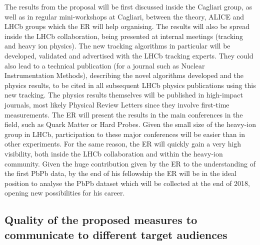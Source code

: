 \documentclass[a4paper,11pt]{article}
\newcommand{\ER}{ER\xspace}
\begin{document}
The results from the proposal will be first discussed inside the
Cagliari group, as well as in regular mini-workshops at Cagliari, 
between the theory, ALICE and LHCb groups which the \ER will
help organising. The results will also be
spread inside the LHCb collaboration, being presented at internal
meetings (tracking and heavy ion physics). The new tracking algorithms
in particular will be developed, validated and advertised with the
LHCb tracking experts. They could also lead to a technical publication
(for a journal such as Nuclear Instrumentation Methods), describing
the novel algorithms developed and the physics results, to be cited in all subsequent LHCb
physics publications using this new tracking. The physics results
themselves will be published in high-impact journals, most likely
Physical Review Letters since they involve first-time
measurements. The \ER will present the results in the main conferences in the
field, such as Quark Matter or Hard Probes. Given
the small size of the heavy-ion group in LHCb, participation to these
major conferences will be easier than in other experiments. For the
same reason, the \ER will quickly gain a very high visibility, both
inside the LHCb collaboration and within the heavy-ion community.
Given the huge contribution given by the \ER to the understanding of the 
first PbPb data, by the end of his fellowship the \ER will be in the 
ideal position to analyse the PbPb dataset which will be collected
at the end of 2018, opening new possibilities for his 
career. 



%           

\subsection{Quality of the proposed measures to communicate to different target audiences }
% 
% 
\end{document}
